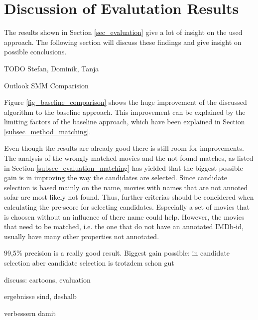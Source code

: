 \section{Discussion of Evalutation Results}
\label{sec_discussion}

The results shown in Section \ref{sec_evaluation} give a lot of insight on the used approach.
The following section will discuss these findings and give insight on possible conclusions.

TODO Stefan, Dominik, Tanja

Outlook SMM Comparision

Figure \ref{fig_baseline_comparison} shows the huge improvement of the discussed algorithm to the baseline approach.
This improvement can be explained by the limiting factors of the baseline approach, which have been explained in Section \ref{subsec_method_matching}.

Even though the results are already good there is still room for improvements.
The analysis of the wrongly matched movies and the not found matches, as listed in Section \ref{subsec_evaluation_matching} has yielded that the biggest possible gain is in improving the way the candidates are selected.
Since candidate selection is based mainly on the name, movies with names that are not annoted sofar are most likely not found.
Thus, further criterias should be concidered when calculating the pre-score for selecting candidates.
Especially a set of movies that is choosen without an influence of there name could help.
However, the movies that need to be matched, i.e. the one that do not have an annotated IMDb-id, usually have many other properties not annotated.

99,5\% precision is a really good result.
Biggest gain possible: in candidate selection
aber candidate selection is trotzdem schon gut

discuss: cartoons, evaluation

ergebnisse sind, deshalb

verbessern damit

